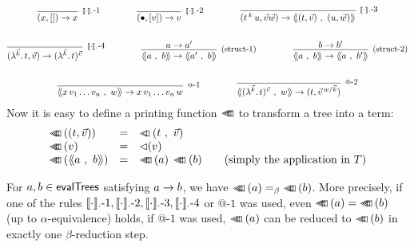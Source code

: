 \documentclass[submission,copyright,creativecommons]{eptcs}
\begin{document}
\begin{gather*}
\infnamed{^{\ev \cdot \cdot \mbox{\small -1} }}{}{(x , \emptyVec) \osr x}
\qquad
\qquad
\infnamed{^{\ev \cdot \cdot \mbox{\small -2}}}{}{(\ovar , \ve v) \osr v}
\qquad
\qquad
\infnamed{^{\ev \cdot \cdot \mbox{\small -3}}}{}{(t \oapp k u , \vec v \vec w) \osr \tree {(t, \vec v)}{(u, \vec w)}}
\\ \\
\infnamed{^{\ev \cdot \cdot \mbox{\small -4}}}{}{(\LaO {\vec k} t , \vec v) \osr \Val {\vec k} t {\vec v}}
\qquad
\qquad
\infnamed{^{\mbox{\small (struct-1)}}}{a \osr a'}{\tree a b \osr \tree {a'} b}
\qquad
\qquad
\infnamed{^{\mbox{\small (struct-2)}}}{b \osr b'}{\tree a b \osr \tree a {b'}}
\\ \\
\infnamed{^{@\mbox{\small -1}}}{}{\tree {x \sspace v_1 \ldots v_n} w \osr  x \sspace v_1 \ldots v_n \sspace w}
\qquad
\qquad
\infnamed{^{@\mbox{\small -2}}}{}{\tree {\Val {\vec k} t {\vec v}}{w}   \osr   (t, \multiinsert {\vec v} {\vec k} w)}
\end{gather*}
Now it is easy to define a printing function $\lhd \hspace{-8pt} \lhd \hspace{-8pt} \lhd$ to transform a tree into a term:
\[
\begin{array}{lclll}
\prTree{(t, \vec v)} & = & \pr {t} {\vec v} &&\\
\prTree{v} & = & \prVal v &&\\
\prTree{\tree a b} & = & \ApA {\prTree a}{\prTree b}&& \mbox{(simply the application in $\te$)}
\end{array}
\]
\begin{prop}
 For $a, b \in \mathsf{evalTrees}$ satisfying $a \rightarrow b$, we have $\prTree a =_\beta \prTree b$. More precisely, if one of the rules ${\llbracket{\cdot}\rrbracket_{\cdot} \mbox{-1} }, {\llbracket{\cdot}\rrbracket_{\cdot} \mbox{-2} }, {\llbracket{\cdot}\rrbracket_{\cdot} \mbox{-3} }, {\llbracket{\cdot}\rrbracket_{\cdot} \mbox{-4} }$ or ${@\mbox{-1}}$ was used, even $\prTree a = \prTree b$ (up to $\alpha$-equivalence) holds, if ${@\mbox{-1}}$ was used,  $\lhd \hspace{-8pt} \lhd \hspace{-8pt} \lhd \left( a \right)$ can be reduced to $\lhd \hspace{-8pt} \lhd \hspace{-8pt} \lhd \left( b \right)$ in exactly one $\beta$-reduction step.
\end{prop}
\end{document}

